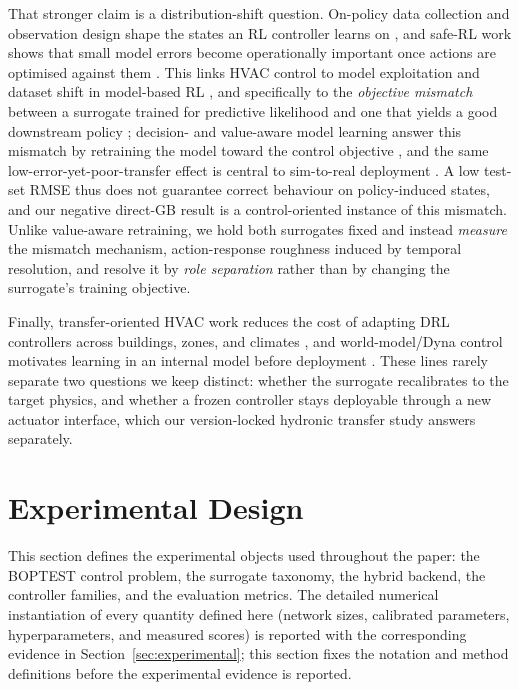 \documentclass[a4paper,fleqn]{cas-sc}
\begin{document}
That stronger claim is a distribution-shift question. On-policy data collection and observation design shape the states an RL controller learns on \citep{Mayor2025Parallelized,Radac2025OnlineRL,Gao2024Predictive}, and safe-RL work shows that small model errors become operationally important once actions are optimised against them \citep{Garcia2015SafeRL,Wang2025SafeDRL}. This links HVAC control to model exploitation and dataset shift in model-based RL \citep{Quinonero2009DatasetShift,RiahiSamani2026OOD}, and specifically to the \emph{objective mismatch} between a surrogate trained for predictive likelihood and one that yields a good downstream policy \citep{Lambert2020ObjectiveMismatch,Janner2019MBPO}; decision- and value-aware model learning answer this mismatch by retraining the model toward the control objective \citep{Farahmand2017VAML}, and the same low-error-yet-poor-transfer effect is central to sim-to-real deployment \citep{Zhao2020Sim2Real}. A low test-set RMSE thus does not guarantee correct behaviour on policy-induced states, and our negative direct-GB result is a control-oriented instance of this mismatch. Unlike value-aware retraining, we hold both surrogates fixed and instead \emph{measure} the mismatch mechanism, action-response roughness induced by temporal resolution, and resolve it by \emph{role separation} rather than by changing the surrogate's training objective.

Finally, transfer-oriented HVAC work reduces the cost of adapting DRL controllers across buildings, zones, and climates \citep{Hou2024MultiSource,Coraci2024HeteroTL,Coraci2025HiLo,Meng2025Lifelong}, and world-model/Dyna control motivates learning in an internal model before deployment \citep{Sutton1991Dyna,Hafner2025Dreamer}. These lines rarely separate two questions we keep distinct: whether the surrogate recalibrates to the target physics, and whether a frozen controller stays deployable through a new actuator interface, which our version-locked hydronic transfer study answers separately.
\section{Experimental Design}\label{sec:methodology}
This section defines the experimental objects used throughout the paper: the BOPTEST control problem, the surrogate taxonomy, the hybrid backend, the controller families, and the evaluation metrics.
The detailed numerical instantiation of every quantity defined here (network
sizes, calibrated parameters, hyperparameters, and measured scores) is reported
with the corresponding evidence in Section~\ref{sec:experimental};
this section fixes the notation and method definitions before the experimental evidence is reported.
\end{document}
